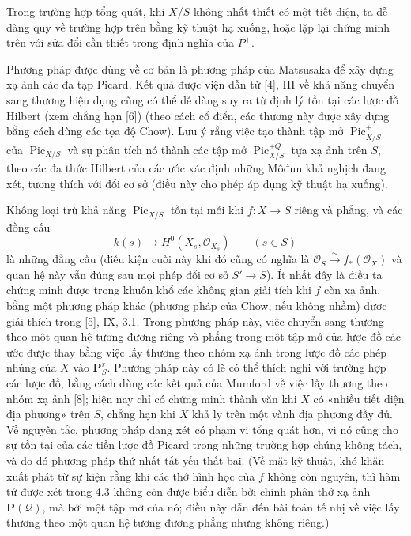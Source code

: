 Trong trường hợp tổng quát, khi $X/S$ không nhất thiết có một tiết diện, ta dễ
dàng quy về trường hợp trên bằng kỹ thuật hạ xuống, hoặc lặp lại chứng minh
trên với sửa đổi cần thiết trong định nghĩa của $P^+$.

 Phương pháp được dùng về cơ bản là phương pháp của
Matsusaka để xây dựng xạ ảnh các đa tạp Picard. Kết quả được viện dẫn từ [4],
III về khả năng chuyển sang thương hiệu dụng cũng có thể dễ dàng suy ra từ
định lý tồn tại các lược đồ Hilbert (xem chẳng hạn [6]) (theo cách cổ điển, các
thương này được xây dựng bằng cách dùng các tọa độ Chow). Lưu ý rằng việc tạo
thành tập mở $\operatorname{Pic}^{+}_{X/S}$ của
$\operatorname{Pic}_{X/S}$ và sự phân tích nó thành các tập mở
$\operatorname{Pic}^{+Q}_{X/S}$ tựa xạ ảnh trên $S$, theo các đa thức Hilbert
của các ước xác định những Môđun khả nghịch đang xét, tương thích với đổi cơ
sở (điều này cho phép áp dụng kỹ thuật hạ xuống).

 Không loại trừ khả năng
$\operatorname{Pic}_{X/S}$ tồn tại mỗi khi $f:X\longrightarrow S$ riêng và
phẳng, và các đồng cấu
\[
k(s)\longrightarrow H^0(X_s,\mathcal O_{X_s})\qquad(s\in S)
\]
là những đẳng cấu (điều kiện cuối này khi đó cũng có nghĩa là
$\mathcal O_S\xrightarrow{\sim}f_*(\mathcal O_X)$ và quan hệ này vẫn đúng sau
mọi phép đổi cơ sở $S'\longrightarrow S$). Ít nhất đây là điều ta chứng minh
được trong khuôn khổ các không gian giải tích khi $f$ còn xạ ảnh, bằng một
phương pháp khác (phương pháp của Chow, nếu không nhầm) được giải thích trong
[5], IX, 3.1. Trong phương pháp này, việc chuyển sang
thương theo một quan hệ tương đương riêng và phẳng trong một tập mở của lược
đồ các ước được thay bằng việc lấy thương theo nhóm xạ ảnh trong lược đồ các
phép nhúng của $X$ vào $\mathbf P^r_S$. Phương pháp này có lẽ có thể thích nghi
với trường hợp các lược đồ, bằng cách dùng các kết quả của Mumford về việc lấy
thương theo nhóm xạ ảnh [8]; hiện nay chỉ có chứng minh thành văn khi $X$ có
«nhiều tiết diện địa phương» trên $S$, chẳng hạn khi $X$ khả ly trên một vành
địa phương đầy đủ. Về nguyên tắc, phương pháp đang xét
có phạm vi tổng quát hơn, vì nó cũng cho sự tồn tại của các tiền lược đồ Picard
trong những trường hợp chúng không tách, và do đó phương pháp thứ nhất tất yếu
thất bại. (Về mặt kỹ thuật, khó khăn xuất phát từ sự kiện rằng khi các thớ hình
học của $f$ không còn nguyên, thì hàm tử được xét trong 4.3 không còn được biểu
diễn bởi chính phân thớ xạ ảnh $\mathbf P(\mathcal Q)$, mà bởi một tập mở của
nó; điều này dẫn đến bài toán tế nhị về việc lấy thương theo một quan hệ tương
đương phẳng nhưng không riêng.)

